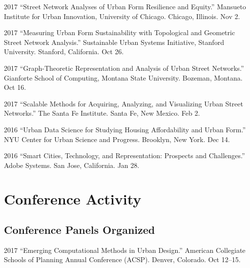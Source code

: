 \documentclass{academiccv}
\begin{document}
\begin{tablist}

\item[2017] \tab \enquote{Street Network Analyses of Urban Form Resilience and Equity.} Mansueto Institute for Urban Innovation, University of Chicago. Chicago, Illinois. Nov 2.

\item[2017] \tab \enquote{Measuring Urban Form Sustainability with Topological and Geometric Street Network Analysis.} Sustainable Urban Systems Initiative, Stanford University. Stanford, California. Oct 26.

\item[2017] \tab \enquote{Graph-Theoretic Representation and Analysis of Urban Street Networks.} Gianforte School of Computing, Montana State University. Bozeman, Montana. Oct 16.

\item[2017] \tab \enquote{Scalable Methods for Acquiring, Analyzing, and Visualizing Urban Street Networks.} The Santa Fe Institute. Santa Fe, New Mexico. Feb 2.

\item[2016] \tab \enquote{Urban Data Science for Studying Housing Affordability and Urban Form.} NYU Center for Urban Science and Progress. Brooklyn, New York. Dec 14.

\item[2016] \tab \enquote{Smart Cities, Technology, and Representation: Prospects and Challenges.} Adobe Systems. San Jose, California. Jan 28.

\end{tablist}



\section*{Conference Activity}

\subsection*{Conference Panels Organized}

\begin{tablist}
	
	\item[2017] \tab \enquote{Emerging Computational Methods in Urban Design.} American Collegiate Schools of Planning Annual Conference (ACSP). Denver, Colorado. Oct 12--15.
	
\end{tablist}
\end{document}
